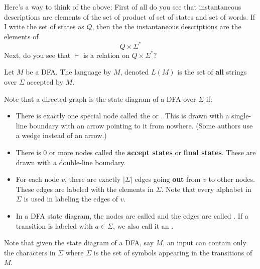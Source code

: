 Here's a way to
think of the above:
First of all do you see that instantaneous descriptions are elements of the
set of product of set of states and set of words.
If I write the set of states as $Q$, then the the instantaneous
descriptions are the elements of 
\[
Q \times \Sigma^*
\]
Next, do you see that $\vdash$ is a relation on $Q \times \Sigma^*$?

\begin{defn}
Let $M$ be a DFA. The language  by $M$, denoted
$L(M)$ is the set of
\textbf{all} strings over $\Sigma$ accepted by
$M$.
\end{defn}

Note that a directed graph is the state diagram of a DFA over
$\Sigma$ if: 
\begin{itemize}

\item There is exactly one special node called the
   or
  .
 This is drawn with a single-line boundary with an arrow pointing to it from nowhere.
 (Some authors use a wedge instead of an arrow.)

 \item There is 0 or more nodes called the
   \textbf{accept states} or
   \textbf{final states}.
 These are drawn with a double-line boundary.

 \item For each node $v$, there are exactly $|\Sigma|$ edges going
 \textbf{out} from $v$ to other nodes. These edges are labeled with the
 elements in $\Sigma$. Note that every alphabet in $\Sigma$ is used
 in labeling the edges of $v$.

 \item In a DFA state diagram, the nodes are called  and the
 edges are called . If a transition is labeled
 with $a \in \Sigma$, we also call it an .

\end{itemize}

Note that given the state diagram of a DFA, say $M$, 
an input can contain only the 
characters in $\Sigma$ where $\Sigma$ is the set of symbols appearing in the
transitions of $M$.


